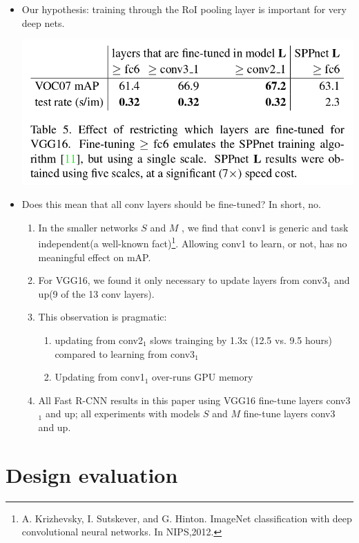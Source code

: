\documentclass[11pt]{book}
\begin{document}
\begin{itemize}
\item Our hypothesis: training through the RoI pooling layer is important for very deep nets.

      \includegraphics[width=.9\linewidth]{./pic_fast_rcnn/table5.png}
\item Does this mean that all conv layers should be fine-tuned?
      In short, no.
\begin{enumerate}
\item In the smaller networks $S$ and $M$ , we find that conv1 is generic and task 
         independent(a well-known fact)\footnote{A. Krizhevsky, I. Sutskever, and G. Hinton.  
ImageNet classification with deep convolutional neural networks. 
In NIPS,2012.
 }. Allowing conv1 to learn, or not, has no
         meaningful effect on mAP.
\item For VGG16, we found it only necessary to update layers from conv3$_1$ and up(9 of the 13
         conv layers).
\item This observation is pragmatic:
\begin{enumerate}
\item updating from conv2$_1$ slows trainging by 1.3x (12.5 vs. 9.5 hours) compared to 
            learning from conv3$_1$
\item Updating from conv1$_1$ over-runs GPU memory
\end{enumerate}
\item All Fast R-CNN results in this paper using VGG16 fine-tune layers conv3$_1$ and up;
         all experiments with models $S$ and $M$ fine-tune layers conv3 and up.
\end{enumerate}
\end{itemize}
         
\chapter{Design evaluation}
\label{sec-1-4}
\end{document}
